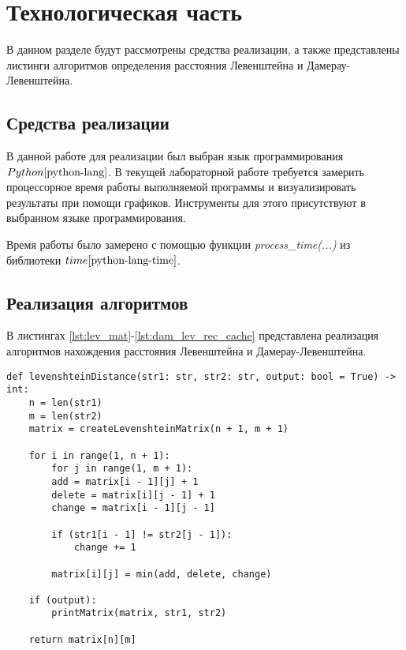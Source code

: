 \chapter{Технологическая часть}

В данном разделе будут рассмотрены средства реализации, а также представлены листинги алгоритмов определения расстояния Левенштейна и Дамерау-Левенштейна.

\section{Средства реализации}
В данной работе для реализации был выбран язык программирования $Python \cite{python-lang}$. В текущей лабораторной работе требуется замерить процессорное время работы выполняемой программы
и визуализировать результаты при помощи графиков. Инструменты для этого присутствуют в выбранном языке программирования.

Время работы было замерено с помощью функции \textit{process\_time(...)} из библиотеки $time \cite{python-lang-time}$.


\section{Реализация алгоритмов}

В листингах \ref{lst:lev_mat}-\ref{lst:dam_lev_rec_cache} представлена реализация алгоритмов нахождения расстояния Левенштейна и Дамерау-Левенштейна.

\clearpage

\begin{center}
    \captionsetup{justification=raggedright,singlelinecheck=off}
    \begin{lstlisting}[label=lst:lev_mat,caption=Алгоритм нахождения расстояния Левенштейна (матричный)]
def levenshteinDistance(str1: str, str2: str, output: bool = True) -> int:
	n = len(str1)
	m = len(str2)
	matrix = createLevenshteinMatrix(n + 1, m + 1)
	
	for i in range(1, n + 1):
		for j in range(1, m + 1):
		add = matrix[i - 1][j] + 1
		delete = matrix[i][j - 1] + 1
		change = matrix[i - 1][j - 1]
		
		if (str1[i - 1] != str2[j - 1]):
			change += 1
		
		matrix[i][j] = min(add, delete, change)
	
	if (output):
		printMatrix(matrix, str1, str2)
	
	return matrix[n][m]
\end{lstlisting}
\end{center}


